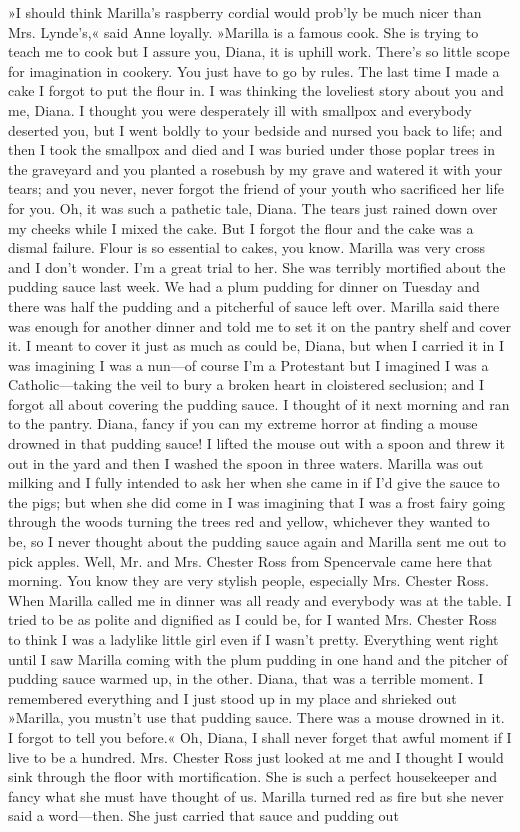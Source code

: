 »I should think Marilla’s raspberry cordial would prob’ly be much nicer than Mrs. Lynde’s,« said Anne loyally. »Marilla is a famous cook. She is trying to teach me to cook but I assure you, Diana, it is uphill work. There’s so little scope for imagination in cookery. You just have to go by rules. The last time I made a cake I forgot to put the flour in. I was thinking the loveliest story about you and me, Diana. I thought you were desperately ill with smallpox and everybody deserted you, but I went boldly to your bedside and nursed you back to life; and then I took the smallpox and died and I was buried under those poplar trees in the graveyard and you planted a rosebush by my grave and watered it with your tears; and you never, never forgot the friend of your youth who sacrificed her life for you. Oh, it was such a pathetic tale, Diana. The tears just rained down over my cheeks while I mixed the cake. But I forgot the flour and the cake was a dismal failure. Flour is so essential to cakes, you know. Marilla was very cross and I don’t wonder. I’m a great trial to her. She was terribly mortified about the pudding sauce last week. We had a plum pudding for dinner on Tuesday and there was half the pudding and a pitcherful of sauce left over. Marilla said there was enough for another dinner and told me to set it on the pantry shelf and cover it. I meant to cover it just as much as could be, Diana, but when I carried it in I was imagining I was a nun—of course I’m a Protestant but I imagined I was a Catholic—taking the veil to bury a broken heart in cloistered seclusion; and I forgot all about covering the pudding sauce. I thought of it next morning and ran to the pantry. Diana, fancy if you can my extreme horror at finding a mouse drowned in that pudding sauce! I lifted the mouse out with a spoon and threw it out in the yard and then I washed the spoon in three waters. Marilla was out milking and I fully intended to ask her when she came in if I’d give the sauce to the pigs; but when she did come in I was imagining that I was a frost fairy going through the woods turning the trees red and yellow, whichever they wanted to be, so I never thought about the pudding sauce again and Marilla sent me out to pick apples. Well, Mr. and Mrs. Chester Ross from Spencervale came here that morning. You know they are very stylish people, especially Mrs. Chester Ross. When Marilla called me in dinner was all ready and everybody was at the table. I tried to be as polite and dignified as I could be, for I wanted Mrs. Chester Ross to think I was a ladylike little girl even if I wasn’t pretty. Everything went right until I saw Marilla coming with the plum pudding in one hand and the pitcher of pudding sauce warmed up, in the other. Diana, that was a terrible moment. I remembered everything and I just stood up in my place and shrieked out »Marilla, you mustn't use that pudding sauce. There was a mouse drowned in it. I forgot to tell you before.« Oh, Diana, I shall never forget that awful moment if I live to be a hundred. Mrs. Chester Ross just looked at me and I thought I would sink through the floor with mortification. She is such a perfect housekeeper and fancy what she must have thought of us. Marilla turned red as fire but she never said a word—then. She just carried that sauce and pudding out 